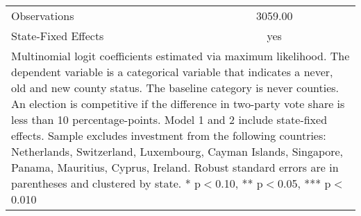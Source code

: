 \begin{table}[!htbp]
\begin{tabular}{l*{2}{c}}
\hline
Observations        &     3059.00   &               \\
State-Fixed Effects &         yes   &               \\
\hline\hline
\multicolumn{3}{p{\linewidth}}{\footnotesize Multinomial logit coefficients estimated via maximum likelihood. The dependent variable is a categorical variable that indicates a never, old and new county status. The baseline category is never counties. An election is competitive if the difference in two-party vote share is less than 10 percentage-points. Model 1 and 2 include state-fixed effects. Sample excludes investment from the following countries: Netherlands, Switzerland, Luxembourg, Cayman Islands, Singapore, Panama, Mauritius, Cyprus, Ireland. Robust standard errors are in parentheses and clustered by state. * p$<$0.10, ** p$<$0.05, *** p$<$0.010}\\
\end{tabular}
\end{table}
